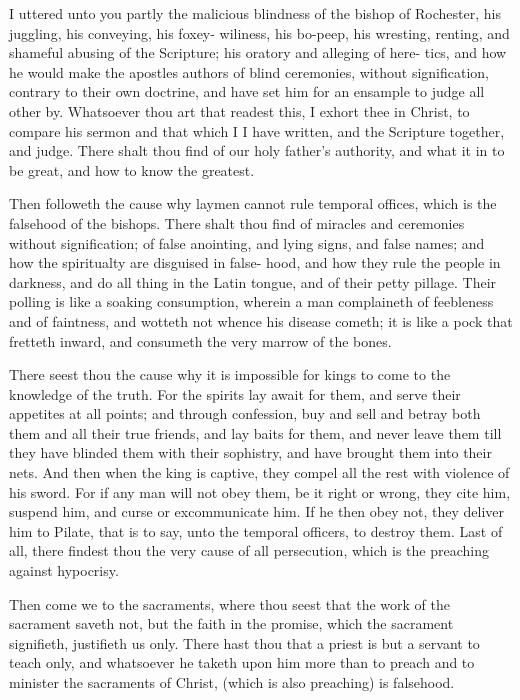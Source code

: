 \documentclass{custom}
\begin{document}
I uttered unto you partly the malicious blindness of the 
bishop of Rochester, his juggling, his conveying, his foxey- 
wiliness, his bo-peep, his wresting, renting, and shameful 
abusing of the Scripture; his oratory and alleging of here- 
tics, and how he would make the apostles authors of blind 
ceremonies, without signification, contrary to their own 
doctrine, and have set him for an ensample to judge all 
other by. Whatsoever thou art that readest this, I exhort 
thee in Christ, to compare his sermon and that which I 
I have written, and the Scripture together, and judge. 
There shalt thou find of our holy father's authority, and 
what it in to be great, and how to know the greatest. 

Then followeth the cause why laymen cannot rule 
temporal offices, which is the falsehood of the bishops. 
There shalt thou find of miracles and ceremonies without 
signification; of false anointing, and lying signs, and false 
names; and how the spiritualty are disguised in false- 
hood, and how they rule the people in darkness, and do 
all thing in the Latin tongue, and of their petty pillage. 
Their polling is like a soaking consumption, wherein a man 
complaineth of feebleness and of faintness, and wotteth not 
whence his disease cometh; it is like a pock that fretteth 
inward, and consumeth the very marrow of the bones. 

There seest thou the cause why it is impossible for 
kings to come to the knowledge of the truth. For the 
spirits lay await for them, and serve their appetites at all 
points; and through confession, buy and sell and betray 
both them and all their true friends, and lay baits for
them, and never leave them till they have blinded them 
with their sophistry, and have brought them into their 
nets. And then when the king is captive, they compel 
all the rest with violence of his sword. For if any man 
will not obey them, be it right or wrong, they cite him, 
suspend him, and curse or excommunicate him. If he 
then obey not, they deliver him to Pilate, that is to say, 
unto the temporal officers, to destroy them. Last of all, 
there findest thou the very cause of all persecution, which 
is the preaching against hypocrisy. 

Then come we to the sacraments, where thou seest 
that the work of the sacrament saveth not, but the faith 
in the promise, which the sacrament signifieth, justifieth 
us only. There hast thou that a priest is but a servant to 
teach only, and whatsoever he taketh upon him more than 
to preach and to minister the sacraments of Christ, (which 
is also preaching) is falsehood. 
\end{document}
